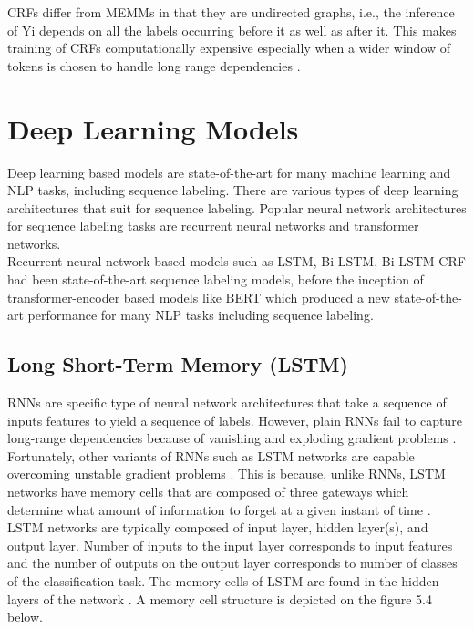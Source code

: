 \ac{CRF}s differ from \ac{MEMM}s in that they are undirected graphs, i.e., the inference of Yi depends on all the labels occurring before it as well as after it. This makes training of CRFs computationally expensive especially when a wider window of tokens is chosen to handle long range dependencies \citep{aggarwal2018machine}. 

\section{Deep Learning Models }
\label{sec:chapter05:MLModels:DLMs}

Deep learning based models are state-of-the-art for many machine learning and \ac{NLP} tasks, including sequence labeling. There are various types of deep learning architectures that suit for sequence labeling. Popular neural network architectures for sequence labeling tasks are recurrent neural networks and  transformer networks. \\

 
Recurrent neural network based models such as \ac{LSTM}, \ac{Bi-LSTM}, \ac{Bi-LSTM-CRF} had been state-of-the-art sequence labeling models, before the inception of transformer-encoder based models like BERT which produced a new state-of-the-art performance for many \ac{NLP} tasks including sequence labeling. 


\subsection{Long Short-Term Memory (\ac{LSTM})}
\label{sec:chapter05:DLModels:LSTM}


\ac{RNN}s are specific type of neural network architectures that take a sequence of inputs features to  yield a sequence of labels. However, plain RNNs fail to capture long-range dependencies because of vanishing and exploding gradient problems \citep{pascanu2013difficulty, fischer2018deep}. \\

Fortunately, other variants of RNNs such as LSTM networks are capable overcoming unstable gradient problems \citep{akhundov2018sequence, lample2016neural, ma2016end}. This is because, unlike RNNs, LSTM networks have memory cells that are composed of three gateways which determine what amount of information to forget at a given instant of time \citep{ma2016end}. \\

LSTM networks are typically composed of input layer, hidden layer(s), and output layer. Number of inputs to the input layer corresponds to input features and the number of outputs on the output layer corresponds to number of classes of the classification task. The memory cells of LSTM are found in the hidden layers of the network \citep{fischer2018deep}. A memory cell structure is depicted on the figure 5.4 below. 

